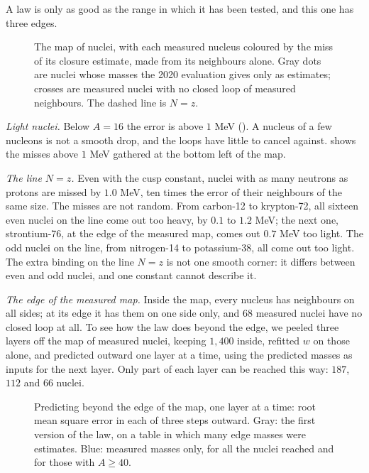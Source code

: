 A law is only as good as the range in which it has been tested, and this one has three edges.

\begin{figure}[tb]
\myfloatalign

\caption[The map of nuclei and the error of the law]{The map of nuclei, with each measured nucleus coloured by the miss of its closure estimate, made from its neighbours alone. Gray dots are nuclei whose masses the 2020 evaluation gives only as estimates; crosses are measured nuclei with no closed loop of measured neighbours. The dashed line is $N = z$.}
\label{fig:cl-chart}
\end{figure}

\emph{Light nuclei.} Below $A = 16$ the error is above $1$ MeV (). A nucleus of a few nucleons is not a smooth drop, and the loops have little to cancel against.  shows the misses above $1$ MeV gathered at the bottom left of the map.

\emph{The line $N = z$.} Even with the cusp constant, nuclei with as many neutrons as protons are missed by $1.0$ MeV, ten times the error of their neighbours of the same size. The misses are not random. From carbon-12 to krypton-72, all sixteen even nuclei on the line come out too heavy, by $0.1$ to $1.2$ MeV; the next one, strontium-76, at the edge of the measured map, comes out $0.7$ MeV too light. The odd nuclei on the line, from nitrogen-14 to potassium-38, all come out too light. The extra binding on the line $N = z$ is not one smooth corner: it differs between even and odd nuclei, and one constant cannot describe it.

\emph{The edge of the measured map.} Inside the map, every nucleus has neighbours on all sides; at its edge it has them on one side only, and $68$ measured nuclei have no closed loop at all. To see how the law does beyond the edge, we peeled three layers off the map of measured nuclei, keeping $1{,}400$ inside, refitted $w$ on those alone, and predicted outward one layer at a time, using the predicted masses as inputs for the next layer. Only part of each layer can be reached this way: $187$, $112$ and $66$ nuclei.

\begin{figure}[tb]
\myfloatalign

\caption[Beyond the edge]{Predicting beyond the edge of the map, one layer at a time: root mean square error in each of three steps outward. Gray: the first version of the law, on a table in which many edge masses were estimates. Blue: measured masses only, for all the nuclei reached and for those with $A \ge 40$.}
\label{fig:cl-edge}
\end{figure}


